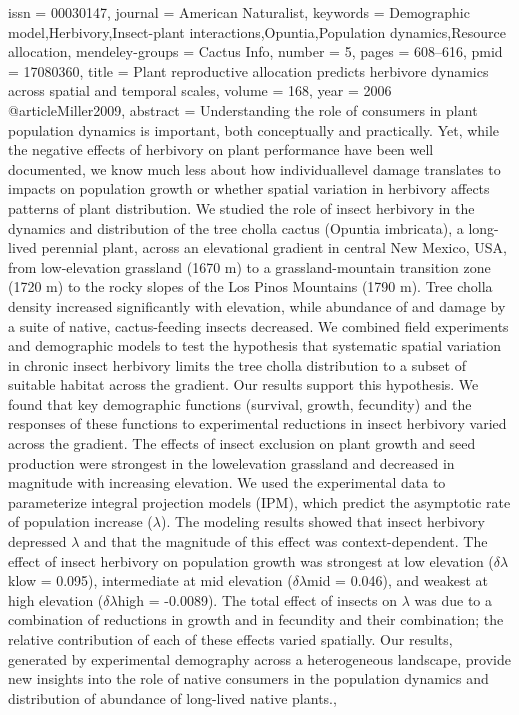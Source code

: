 {{issn = {00030147},
journal = {American Naturalist},
keywords = {Demographic model,Herbivory,Insect-plant interactions,Opuntia,Population dynamics,Resource allocation},
mendeley-groups = {Cactus Info},
number = {5},
pages = {608--616},
pmid = {17080360},
title = {{Plant reproductive allocation predicts herbivore dynamics across spatial and temporal scales}},
volume = {168},
year = {2006}
}
@article{Miller2009,
abstract = {Understanding the role of consumers in plant population dynamics is important, both conceptually and practically. Yet, while the negative effects of herbivory on plant performance have been well documented, we know much less about how individuallevel damage translates to impacts on population growth or whether spatial variation in herbivory affects patterns of plant distribution. We studied the role of insect herbivory in the dynamics and distribution of the tree cholla cactus (Opuntia imbricata), a long-lived perennial plant, across an elevational gradient in central New Mexico, USA, from low-elevation grassland (1670 m) to a grassland-mountain transition zone (1720 m) to the rocky slopes of the Los Pinos Mountains (1790 m). Tree cholla density increased significantly with elevation, while abundance of and damage by a suite of native, cactus-feeding insects decreased. We combined field experiments and demographic models to test the hypothesis that systematic spatial variation in chronic insect herbivory limits the tree cholla distribution to a subset of suitable habitat across the gradient. Our results support this hypothesis. We found that key demographic functions (survival, growth, fecundity) and the responses of these functions to experimental reductions in insect herbivory varied across the gradient. The effects of insect exclusion on plant growth and seed production were strongest in the lowelevation grassland and decreased in magnitude with increasing elevation. We used the experimental data to parameterize integral projection models (IPM), which predict the asymptotic rate of population increase ($\lambda$). The modeling results showed that insect herbivory depressed $\lambda$ and that the magnitude of this effect was context-dependent. The effect of insect herbivory on population growth was strongest at low elevation ($\delta$$\lambda$klow = 0.095), intermediate at mid elevation ($\delta$$\lambda$mid = 0.046), and weakest at high elevation ($\delta$$\lambda$high = -0.0089). The total effect of insects on $\lambda$ was due to a combination of reductions in growth and in fecundity and their combination; the relative contribution of each of these effects varied spatially. Our results, generated by experimental demography across a heterogeneous landscape, provide new insights into the role of native consumers in the population dynamics and distribution of abundance of long-lived native plants.},
}}

